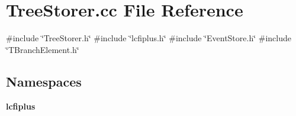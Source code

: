 \section{Tree\+Storer.\+cc File Reference}
\label{TreeStorer_8cc}
{\ttfamily \#include \char`\"{}Tree\+Storer.\+h\char`\"{}}\newline
{\ttfamily \#include \char`\"{}lcfiplus.\+h\char`\"{}}\newline
{\ttfamily \#include \char`\"{}Event\+Store.\+h\char`\"{}}\newline
{\ttfamily \#include \char`\"{}T\+Branch\+Element.\+h\char`\"{}}\newline
\subsection*{Namespaces}
\begin{DoxyCompactItemize}
\item 
 \textbf{ lcfiplus}
\end{DoxyCompactItemize}

